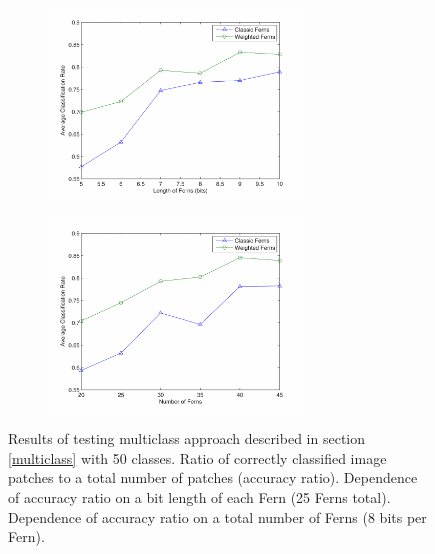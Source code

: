 \begin{figure}[ht]
    \centering

	\begin{subfigure}[b]{.45\linewidth}
	   \includegraphics[height=2in]{images/fernlen.png}
\label{lenferns}
\caption{}
	 \end{subfigure}
	\begin{subfigure}[b]{.45\linewidth}
	   \includegraphics[height=2in]{images/fernnum.png}
\label{numferns}
\caption{}
\end{subfigure}
  \caption{Results of testing multiclass approach described in section \ref{multiclass} with 50 classes.  Ratio of correctly classified image patches to a total number of patches (accuracy ratio). \protect {}  Dependence of accuracy ratio on a bit length of each Fern (25 Ferns total).  \protect{} Dependence of accuracy ratio on a total number of Ferns (8 bits per Fern).  }
\label{multires}
\end{figure}

